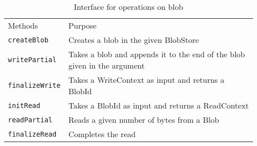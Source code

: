\begin{table}[hbt]
\caption{Interface for operations on blob}
\label{tab:interface-blob}
\begin{center}
  \begin{tabularx}{0.91\textwidth}{lX}
    \hline\noalign{\smallskip}
    Methods & Purpose \\
    \noalign{\smallskip}
    \hline
    \noalign{\smallskip}
    \texttt{createBlob} & Creates a blob in the given BlobStore\\
    \texttt{writePartial} & Takes a blob and appends it to the end of the blob given in the argument\\
    \texttt{finalizeWrite} & Takes a WriteContext as input and returns a BlobId \\
    \texttt{initRead} & Takes a BlobId as input and returns a ReadContext \\
    \texttt{readPartial} & Reads a given number of bytes from a Blob \\
    \texttt{finalizeRead} & Completes the read \\
    \hline
  \end{tabularx}
\end{center}
\end{table}
